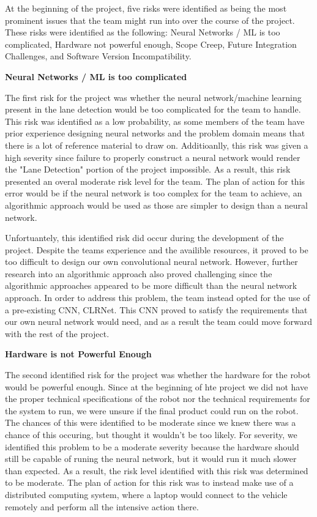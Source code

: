 \documentclass[titlepage,draft]{article}
\begin{document}
At the beginning of the project, five risks were identified as being the most prominent issues that the team might run into over the course of the project. These risks were identified as the following: Neural Networks / ML is too complicated, Hardware not powerful enough, Scope Creep, Future Integration Challenges, and Software Version Incompatibility.

\textbf{Neural Networks / ML is too complicated}

The first risk for the project was whether the neural network/machine learning present in the lane detection would be too complicated for the team to handle. This risk was identified as a low probability, as some members of the team have prior experience designing neural networks and the problem domain means that there is a lot of reference material to draw on. Additioanlly, this risk was given a high severity since failure to properly construct a neural network would render the "Lane Detection" portion of the project impossible. As a result, this risk presented an overal moderate risk level for the team. The plan of action for this error would be if the neural network is too complex for the team to achieve, an algorithmic approach would be used as those are simpler to design than a neural network.

Unfortuantely, this identified risk did occur during the development of the project. Despite the teams experience and the availible resources, it proved to be too difficult to design our own convolutional neural network. However, further research into an algorithmic approach also proved challenging since the algorithmic approaches appeared to be more difficult than the neural network approach. In order to address this problem, the team instead opted for the use of a pre-existing CNN, CLRNet. This CNN proved to satisfy the requirements that our own neural network would need, and as a result the team could move forward with the rest of the project.

\textbf{Hardware is not Powerful Enough}

The second identified risk for the project was whether the hardware for the robot would be powerful enough. Since at the beginning of hte project we did not have the proper technical specifications of the robot nor the technical requirements for the system to run, we were unsure if the final product could run on the robot. The chances of this were identified to be moderate since we knew there was a chance of this occuring, but thought it wouldn't be too likely. For severity, we identified this problem to be a moderate severity because the hardware should still be capable of runing the neural network, but it would run it much slower than expected. As a result, the risk level identified with this risk was determined to be moderate. The plan of action for this risk was to instead make use of a distributed computing system, where a laptop would connect to the vehicle remotely and perform all the intensive action there.
\end{document}
